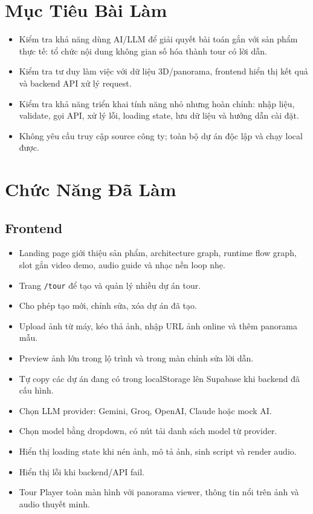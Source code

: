 \documentclass[12pt,a4paper]{article}
\begin{document}
\section{Mục Tiêu Bài Làm}

\begin{itemize}
  \item Kiểm tra khả năng dùng AI/LLM để giải quyết bài toán gắn với sản phẩm thực tế: tổ chức nội dung không gian số hóa thành tour có lời dẫn.
  \item Kiểm tra tư duy làm việc với dữ liệu 3D/panorama, frontend hiển thị kết quả và backend API xử lý request.
  \item Kiểm tra khả năng triển khai tính năng nhỏ nhưng hoàn chỉnh: nhập liệu, validate, gọi API, xử lý lỗi, loading state, lưu dữ liệu và hướng dẫn cài đặt.
  \item Không yêu cầu truy cập source công ty; toàn bộ dự án độc lập và chạy local được.
\end{itemize}

\section{Chức Năng Đã Làm}

\subsection{Frontend}

\begin{itemize}
  \item Landing page giới thiệu sản phẩm, architecture graph, runtime flow graph, slot gắn video demo, audio guide và nhạc nền loop nhẹ.
  \item Trang \texttt{/tour} để tạo và quản lý nhiều dự án tour.
  \item Cho phép tạo mới, chỉnh sửa, xóa dự án đã tạo.
  \item Upload ảnh từ máy, kéo thả ảnh, nhập URL ảnh online và thêm panorama mẫu.
  \item Preview ảnh lớn trong lộ trình và trong màn chỉnh sửa lời dẫn.
  \item Tự copy các dự án đang có trong localStorage lên Supabase khi backend đã cấu hình.
  \item Chọn LLM provider: Gemini, Groq, OpenAI, Claude hoặc mock AI.
  \item Chọn model bằng dropdown, có nút tải danh sách model từ provider.
  \item Hiển thị loading state khi nén ảnh, mô tả ảnh, sinh script và render audio.
  \item Hiển thị lỗi khi backend/API fail.
  \item Tour Player toàn màn hình với panorama viewer, thông tin nổi trên ảnh và audio thuyết minh.
\end{itemize}
\end{document}
